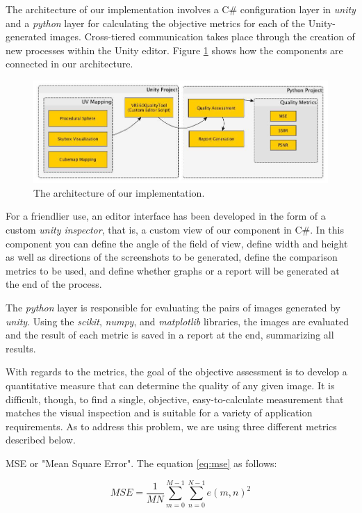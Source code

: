 \documentclass[12pt]{article}
\begin{document}
The architecture of our implementation involves a C\# configuration layer in \textit{unity} and a \textit{python} layer for calculating the objective metrics for each of the Unity-generated images. Cross-tiered communication takes place through the creation of new processes within the Unity editor. Figure \ref{fig:toolarch} shows how the components are connected in our architecture.

\begin{figure}[ht]
\centering
\includegraphics[width=\textwidth]{images/tool_arch_en.jpg}
\caption{The architecture of our implementation.}
\label{fig:toolarch}
\end{figure}

For a friendlier use, an editor interface has been developed in the form of a custom \textit{unity inspector}, that is, a custom view of our component in C\#. In this component you can define the angle of the field of view, define width and height as well as directions of the screenshots to be generated, define the comparison metrics to be used, and define whether graphs or a report will be generated at the end of the process.

The \textit{python} layer is responsible for evaluating the pairs of images generated by \textit{unity}. Using the \textit{scikit}, \textit{numpy}, and \textit{matplotlib} libraries, the images are evaluated and the result of each metric is saved in a report at the end, summarizing all results. 

With regards to the metrics, the goal of the objective assessment is to develop a quantitative measure that can determine the quality of any given image. It is difficult, though, to find a single, objective, easy-to-calculate measurement that matches the visual inspection and is suitable for a variety of application requirements. As to address this problem, we are using three different metrics described below.

MSE or "Mean Square Error". The equation \ref{eq:mse} as follows:

\begin{equation}
MSE=\frac{1}{MN}\sum_{m=0}^{M-1}{\sum_{n=0}^{N-1}{e(m,n)^2}}
\label{eq:mse}
\end{equation}
\end{document}
